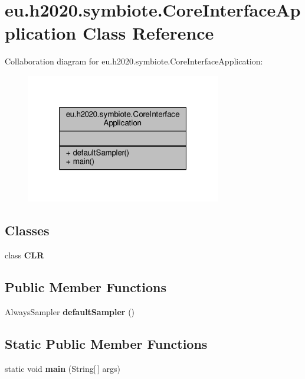 \hypertarget{classeu_1_1h2020_1_1symbiote_1_1CoreInterfaceApplication}{}\section{eu.\+h2020.\+symbiote.\+Core\+Interface\+Application Class Reference}
\label{classeu_1_1h2020_1_1symbiote_1_1CoreInterfaceApplication}


Collaboration diagram for eu.\+h2020.\+symbiote.\+Core\+Interface\+Application\+:\nopagebreak
\begin{figure}[H]
\begin{center}
\leavevmode
\includegraphics[width=241pt]{classeu_1_1h2020_1_1symbiote_1_1CoreInterfaceApplication__coll__graph}
\end{center}
\end{figure}
\subsection*{Classes}
\begin{DoxyCompactItemize}
\item 
class {\bfseries C\+LR}
\end{DoxyCompactItemize}
\subsection*{Public Member Functions}
\begin{DoxyCompactItemize}
\item 
\mbox{\label{classeu_1_1h2020_1_1symbiote_1_1CoreInterfaceApplication_a471bb0daa5bb1e4f52cdca00b81fae69}} 
Always\+Sampler {\bfseries default\+Sampler} ()
\end{DoxyCompactItemize}
\subsection*{Static Public Member Functions}
\begin{DoxyCompactItemize}
\item 
\mbox{\label{classeu_1_1h2020_1_1symbiote_1_1CoreInterfaceApplication_a7c7036fb52bab67977fa57f6200b0b7e}} 
static void {\bfseries main} (String\mbox{[}$\,$\mbox{]} args)
\end{DoxyCompactItemize}


